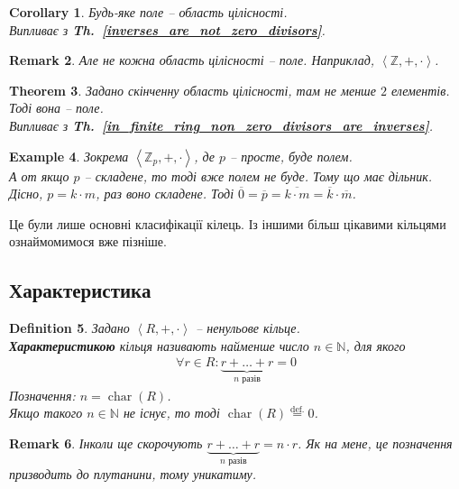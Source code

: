 \documentclass[a4paper, 10pt]{article}
\theoremstyle{theoremdd}
\newtheorem{theorem}{Theorem}[subsection]
\theoremstyle{theoremdd}
\newtheorem{definition}[theorem]{Definition}
\theoremstyle{theoremdd}
\theoremstyle{theoremdd}
\theoremstyle{theoremdd}
\newtheorem{example}[theorem]{Example}
\theoremstyle{theoremdd}
\theoremstyle{theoremdd}
\theoremstyle{theoremdd}
\theoremstyle{theoremdd}
\theoremstyle{theoremdd}
\theoremstyle{theoremdd}
\newtheorem{remark}[theorem]{Remark}
\theoremstyle{theoremdd}
\theoremstyle{theoremdd}
\theoremstyle{theoremdd}
\newtheorem{corollary}[theorem]{Corollary}
\theoremstyle{theoremdd}
\DeclareMathOperator{\charac}{char}
\newcommand\thref[1]{\textbf{Th.~\ref{#1}}}
\newcommand{\eqbydef}{\overset{\text{def.}}{=}}
\begin{document}
\begin{corollary}
Будь-яке поле -- область цілісності.\\
\textit{Випливає з} \thref{inverses_are_not_zero_divisors}.
\end{corollary}

\begin{remark}
Але не кожна область цілісності -- поле. Наприклад, $\left< \mathbb{Z},+,\cdot \right>$.
\end{remark}

\begin{theorem}
Задано скінченну область цілісності, там не менше $2$ елементів. Тоді вона -- поле.\\
\textit{Випливає з} \thref{in_finite_ring_non_zero_divisors_are_inverses}.
\end{theorem}

\begin{example}
Зокрема $\left<\mathbb{Z}_p, + ,\cdot \right>$, де $p$ -- просте, буде полем.\\
А от якщо $p$ -- складене, то тоді вже полем не буде. Тому що має дільник. Дісно, $p = k \cdot m$, раз воно складене. Тоді $\overline{0} = \overline{p} = \overline{k \cdot m} = \overline{k} \cdot \overline{m}$.
\end{example}

Це були лише основні класифікації кілець. Із іншими більш цікавими кільцями ознаймомимося вже пізніше.

\subsection{Характеристика}
\begin{definition}
Задано $\left< R, +, \cdot \right>$ -- ненульове кільце.\\
\textbf{Характеристикою} кільця називають найменше число $n \in \mathbb{N}$, для якого
\begin{align*}
\forall r \in R: \underbrace{r+\dots+r}_{n\text{ разів}} = 0
\end{align*}
Позначення: $n = \charac(R)$.\\
Якщо такого $n \in \mathbb{N}$ не існує, то тоді $\charac(R) \eqbydef 0$.
\end{definition}

\begin{remark}
Інколи ще скорочують $\underbrace{r+\dots+r}_{n\text{ разів}} = n \cdot r$. Як на мене, це позначення призводить до плутанини, тому уникатиму.
\end{remark}
\end{document}
